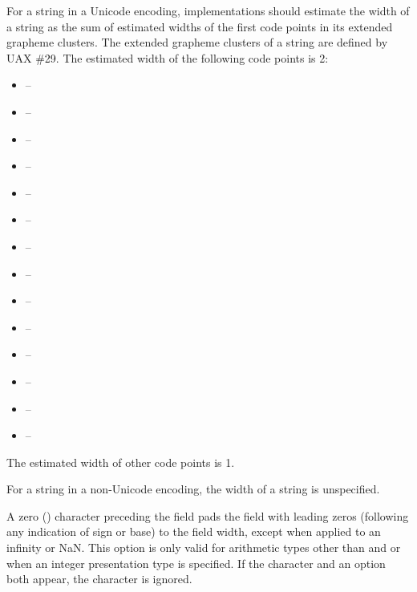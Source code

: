 \pnum
For a string in a Unicode encoding,
implementations should estimate the width of a string
as the sum of estimated widths of
the first code points in its extended grapheme clusters.
The extended grapheme clusters of a string are defined by UAX \#29.
The estimated width of the following code points is 2:
\begin{itemize}
\item {} -- 
\item {} -- 
\item {} -- 
\item {} -- 
\item {} -- 
\item {} -- 
\item {} -- 
\item {} -- 
\item {} -- 
\item {} -- 
\item {} -- 
\item {} -- 
\item {} -- 
\item {} -- 
\end{itemize}
The estimated width of other code points is 1.

\pnum
For a string in a non-Unicode encoding, the width of a string is unspecified.

\pnum
A zero () character
preceding the  field
pads the field with leading zeros (following any indication of sign or base)
to the field width,
except when applied to an infinity or NaN.
This option is only valid for
arithmetic types other than  and 
or when an integer presentation type is specified.
If the  character and an  option both appear,
the  character is ignored.
\begin{example}
\end{example}

